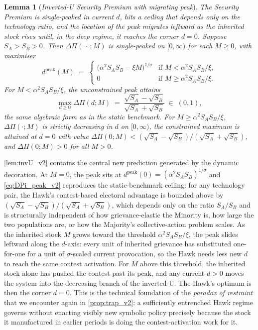 \documentclass[11pt,twoside]{extarticle}
\newtheorem{lemma}{Lemma}
\begin{document}
\begin{lemma}[\emph{Inverted-U Security Premium with migrating peak}]\label{lem:invU_v2}\label{lem:reaction_invertedU}
\emph{The Security Premium is single-peaked in current $d$, hits a ceiling that depends only on the technology ratio, and the location of the peak migrates leftward as the inherited stock rises until, in the deep regime, it reaches the corner $d=0$.}
Suppose $S_A>S_B>0$. Then $\Delta\Pi(\,\cdot\,;M)$ is single-peaked on $[0,\infty)$ for each $M\ge 0$, with maximiser
\begin{equation}\label{eq:dpeak_v2}
    d^{\mathrm{peak}}(M)\;=\;\begin{cases}
        \big(\alpha^2 S_A S_B-\xi M\big)^{1/\sigma} & \text{if }M<\alpha^2 S_A S_B/\xi,\\
        0 & \text{if }M\ge\alpha^2 S_A S_B/\xi.
    \end{cases}
\end{equation}
For $M<\alpha^2 S_A S_B/\xi$, the unconstrained peak attains
\begin{equation}\label{eq:DPi_peak_v2}
    \max_{d\ge 0}\Delta\Pi(d;M)\;=\;\frac{\sqrt{S_A}-\sqrt{S_B}}{\sqrt{S_A}+\sqrt{S_B}}\;\in\;(0,1),
\end{equation}
the same algebraic form as in the static benchmark. For $M\ge\alpha^2 S_A S_B/\xi$, $\Delta\Pi(\cdot;M)$ is strictly decreasing in $d$ on $[0,\infty)$, the constrained maximum is attained at $d=0$ with value $\Delta\Pi(0;M)<(\sqrt{S_A}-\sqrt{S_B})/(\sqrt{S_A}+\sqrt{S_B})$, and $\Delta\Pi(0;M)>0$ for all $M>0$.
\end{lemma}

\autoref{lem:invU_v2} contains the central new prediction generated by the dynamic decoration. At $M=0$, the peak sits at $d^{\mathrm{peak}}(0)=(\alpha^2 S_A S_B)^{1/\sigma}$ and \autoref{eq:DPi_peak_v2} reproduces the static-benchmark ceiling: for any technology pair, the Hawk's contest-based electoral advantage is bounded above by $(\sqrt{S_A}-\sqrt{S_B})/(\sqrt{S_A}+\sqrt{S_B})$, which depends only on the ratio $S_A/S_B$ and is structurally independent of how grievance-elastic the Minority is, how large the two populations are, or how the Majority's collective-action problem scales. As the inherited stock $M$ grows toward the threshold $\alpha^2 S_A S_B/\xi$, the peak slides leftward along the $d$-axis: every unit of inherited grievance has substituted one-for-one for a unit of $\sigma$-scaled current provocation, so the Hawk needs less new $d$ to reach the same contest activation. For $M$ above this threshold, the inherited stock alone has pushed the contest past its peak, and any current $d>0$ moves the system into the decreasing branch of the inverted-U. The Hawk's optimum is then the corner $d=0$. This is the technical foundation of the \emph{paradox of restraint} that we encounter again in \autoref{prop:trap_v2}: a sufficiently entrenched Hawk regime governs without enacting visibly new symbolic policy precisely because the stock it manufactured in earlier periods is doing the contest-activation work for it.
\end{document}
